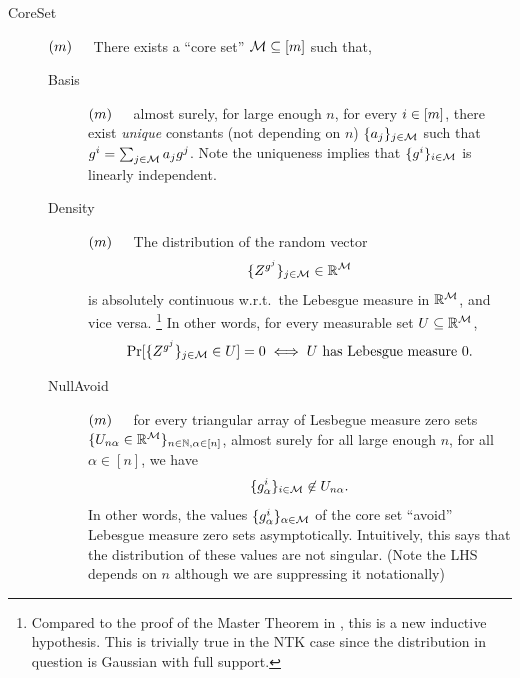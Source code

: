\documentclass[main.tex]{subfiles}
\begin{document}
\begin{description}
\item[CoreSet\label{IH:coreSet}]\!\!\!$(m)$\ \ \ 
    There exists a ``core set'' $\mathcal{M} \subseteq [m]$ such that, 
  \begin{description}
    \item[Basis\label{prop:basis}]\!\!\!$(m)$\ \ \ 
      almost surely, for large enough $n$, for every $i \in [m]$, there exist \emph{unique} constants (not depending on $n$) $\{a_j\}_{j \in \mathcal{M}}$ such that $g^i = \sum_{j \in \mathcal{M}} a_j g^j$.
      Note the uniqueness implies that $\{g^i\}_{i \in \mathcal{M}}$ is linearly independent.
    \item[Density\label{prop:density}]\!\!\!$(m)$\ \ \ 
      The distribution of the random vector
      \[\{Z^{g^j}\}_{j \in \mathcal{M}} \in \mathbb{R}^{\mathcal{M}}\]
      is absolutely continuous w.r.t.\ the Lebesgue measure in $\mathbb{R}^{\mathcal{M}}$, and vice versa.%
      \footnote{
        {Compared to the proof of the Master Theorem in \citet{yangTP2}, this is a new inductive hypothesis.
        This is trivially true in the NTK case since the distribution in question is Gaussian with full support.}}
      In other words, for every measurable set $U \subseteq \mathbb{R}^{\mathcal{M}}$,
      \[\Pr[\{Z^{g^j}\}_{j \in \mathcal{M}} \in U] = 0 \iff \text{$U$ has Lebesgue measure 0.}\]
    \item[NullAvoid\label{prop:nullAvoid}]\!\!\!$(m)$\ \ \ 
      for every triangular array of Lesbegue measure zero sets $\{U_{n\alpha} \in \mathbb{R}^{\mathcal{M}} \}_{n \in \mathbb{N}, \alpha \in [n]}$, almost surely for all large enough $n$, for all $\alpha \in [n]$, we have
      \[\{g^i_\alpha\}_{i \in \mathcal{M}} \not \in U_{n\alpha}.\]
      In other words, the values $\{g^i_\alpha\}_{\alpha \in \mathcal{M}}$ of the core set ``avoid'' Lebesgue measure zero sets asymptotically.
      Intuitively, this says that the distribution of these values are not singular.
      (Note the LHS depends on $n$ although we are suppressing it notationally)
  \end{description}
\end{description}
\end{document}
